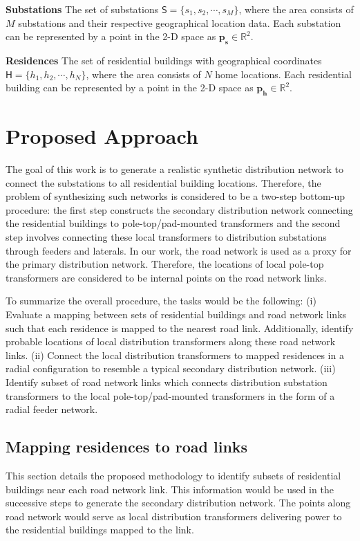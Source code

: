 \documentclass[sigconf]{acmart}
\begin{document}
\noindent\textbf{Substations} The set of substations $\mathsf{S}=\{s_1,s_2,\cdots,s_M\}$, where the area consists of $M$ substations and their respective geographical location data. Each substation can be represented by a point in the 2-D space as $\mathbf{p_s}\in\mathbb{R}^2$.

\noindent\textbf{Residences} The set of residential buildings with geographical coordinates $\mathsf{H}=\{h_1,h_2,\cdots,h_N\}$, where the area consists of $N$ home locations. Each residential building can be represented by a point in the 2-D space as $\mathbf{p_h}\in\mathbb{R}^2$.


\section{Proposed Approach}\label{sec:approach}
The goal of this work is to generate a realistic synthetic distribution network to connect the substations to all residential building locations. Therefore, the problem of synthesizing such networks is considered to be a two-step bottom-up procedure: the first step constructs the secondary distribution network connecting the residential buildings to pole-top/pad-mounted transformers and the second step involves connecting these local transformers to distribution substations through feeders and laterals. In our work, the road network is used as a proxy for the primary distribution network. Therefore, the locations of local pole-top transformers are considered to be internal points on the road network links.

To summarize the overall procedure, the tasks would be the following:
(i) Evaluate a mapping between sets of residential buildings and road network links such that each residence is mapped to the nearest road link. Additionally, identify probable locations of local distribution transformers along these road network links.
(ii)  Connect the local distribution transformers to mapped residences in a radial configuration to resemble a typical secondary distribution network.
(iii) Identify subset of road network links which connects distribution substation transformers to the local pole-top/pad-mounted transformers in the form of a radial feeder network.

\subsection{Mapping residences to road links}\label{ssec:map}
This section details the proposed methodology to identify subsets of residential buildings near each road network link. This information would be used in the successive steps to generate the secondary distribution network. The points along road network would serve as local distribution transformers delivering power to the residential buildings mapped to the link.
\end{document}

